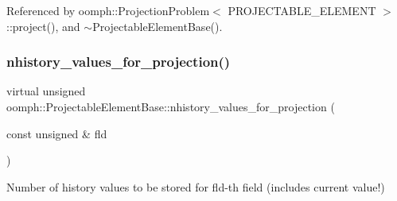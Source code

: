Referenced by oomph\+::\+Projection\+Problem$<$ P\+R\+O\+J\+E\+C\+T\+A\+B\+L\+E\+\_\+\+E\+L\+E\+M\+E\+N\+T $>$\+::project(), and $\sim$\+Projectable\+Element\+Base().

\mbox{\label{classoomph_1_1ProjectableElementBase_ac6790f394630b964663281f8740f43a5}} 
\subsubsection{\texorpdfstring{nhistory\+\_\+values\+\_\+for\+\_\+projection()}{nhistory\_values\_for\_projection()}}
{\footnotesize\ttfamily virtual unsigned oomph\+::\+Projectable\+Element\+Base\+::nhistory\+\_\+values\+\_\+for\+\_\+projection (\begin{DoxyParamCaption}\item[{const unsigned \&}]{fld }\end{DoxyParamCaption})\hspace{0.3cm}{\ttfamily [pure virtual]}}



Number of history values to be stored for fld-\/th field (includes current value!) 



